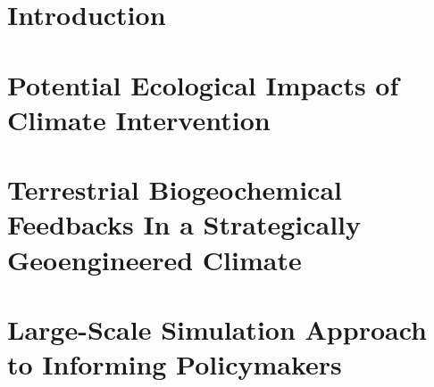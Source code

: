 \documentclass[landscape,custom]{sciposter}
\begin{document}
\begin{multicols}{3}

\section*{\large Introduction}



\section*{\large Potential Ecological Impacts of Climate Intervention}



\section*{\large Terrestrial Biogeochemical Feedbacks In a Strategically Geoengineered Climate}



\null\vskip0.30in


%


\section*{\large Large-Scale Simulation Approach to Informing Policymakers}


\end{multicols}
\end{document}
